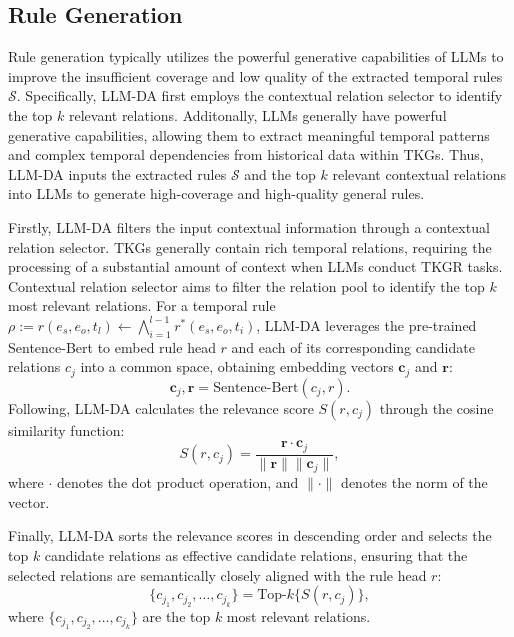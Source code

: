 \documentclass{article}
\begin{document}
\subsection{Rule Generation}
Rule generation typically utilizes the powerful generative capabilities of LLMs to improve the insufficient coverage and low quality of the extracted temporal rules $\mathcal{S}$. Specifically, LLM-DA first employs the contextual relation selector to identify the top $k$ relevant relations. 
Additonally, LLMs generally have powerful generative capabilities, allowing them to extract meaningful temporal patterns and complex temporal dependencies from historical data within TKGs. Thus, LLM-DA inputs the extracted rules $\mathcal{S}$ and the top $k$ relevant contextual relations into LLMs to generate high-coverage and high-quality general rules. 

Firstly, LLM-DA filters the input contextual information through a contextual relation selector. TKGs generally contain rich temporal relations, requiring the processing of a substantial amount of context when LLMs conduct TKGR tasks.  
Contextual relation selector aims to filter the relation pool to identify the top $k$ most relevant relations. For a temporal rule $\rho := r(e_s, e_o, t_l) \leftarrow \bigwedge_{i=1}^{l-1} r^*(e_s, e_o, t_i)$, LLM-DA leverages the pre-trained Sentence-Bert \citep{reimers-gurevych-2019-sentence} to embed rule head $r$ and each of its corresponding candidate relations $c_j$ into a common space, obtaining embedding vectors $\mathbf{c}_j$ and $\mathbf{r}$: 
\begin{equation}
    \mathbf{c}_j, \mathbf{r} = \text{Sentence-Bert}(c_j, r).
\end{equation}
Following, LLM-DA calculates the relevance score $S(r, c_j)$ through the cosine similarity function:
\begin{equation}
S(r, c_j) = \frac{\mathbf{r} \cdot \mathbf{c}_j}{\|\mathbf{r}\| \|\mathbf{c}_j\|},
\end{equation}
where $\cdot$ denotes the dot product operation, and $\|\cdot\|$ denotes the norm of the vector.

Finally, LLM-DA sorts the relevance scores in descending order and selects the top $k$ candidate relations as effective candidate relations, ensuring that the selected relations are semantically closely aligned with the rule head $r$:
\begin{equation}
    \{c_{j_1}, c_{j_2}, \ldots, c_{j_k}\} = \text{Top-}k\{S(r, c_j)\},
\end{equation}
where $\{c_{j_1}, c_{j_2}, \ldots, c_{j_k}\}$ are the top $k$ most relevant relations.
\end{document}
